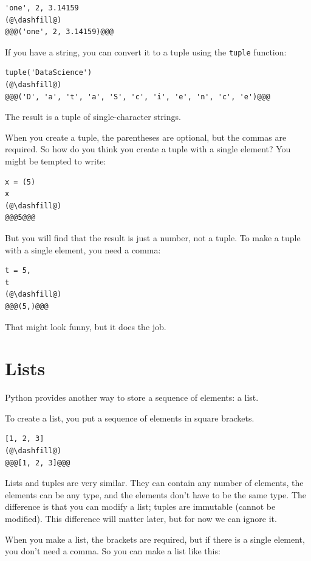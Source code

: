 \begin{lstlisting}[]
'one', 2, 3.14159 
(@\dashfill@)
@@@('one', 2, 3.14159)@@@
\end{lstlisting}

If you have a string, you can convert it to a tuple using the
\passthrough{\lstinline!tuple!} function:

\begin{lstlisting}[]
tuple('DataScience')
(@\dashfill@)
@@@('D', 'a', 't', 'a', 'S', 'c', 'i', 'e', 'n', 'c', 'e')@@@
\end{lstlisting}

The result is a tuple of single-character strings.

When you create a tuple, the parentheses are optional, but the commas
are required. So how do you think you create a tuple with a single
element? You might be tempted to write:

\begin{lstlisting}[]
x = (5)
x
(@\dashfill@)
@@@5@@@
\end{lstlisting}

But you will find that the result is just a number, not a tuple. To make
a tuple with a single element, you need a comma:

\begin{lstlisting}[]
t = 5,
t
(@\dashfill@)
@@@(5,)@@@
\end{lstlisting}

That might look funny, but it does the job.

\hypertarget{lists}{%
\section{Lists}\label{lists}}

Python provides another way to store a sequence of elements: a list.

To create a list, you put a sequence of elements in square brackets.

\begin{lstlisting}[]
[1, 2, 3]
(@\dashfill@)
@@@[1, 2, 3]@@@
\end{lstlisting}

Lists and tuples are very similar. They can contain any number of
elements, the elements can be any type, and the elements don't have to
be the same type. The difference is that you can modify a list; tuples
are immutable (cannot be modified). This difference will matter later,
but for now we can ignore it.

When you make a list, the brackets are required, but if there is a
single element, you don't need a comma. So you can make a list like
this:

